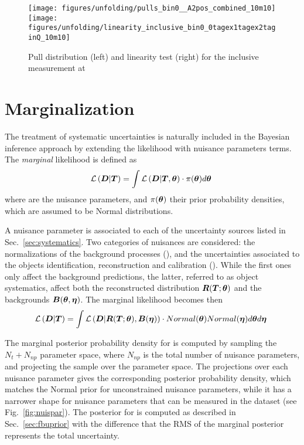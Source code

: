 \begin{figure}[!htb]\centering
  \texttt{[image: figures/unfolding/pulls\_bin0\_\_A2pos\_combined\_10m10]}
  \texttt{[image: figures/unfolding/linearity\_inclusive\_bin0\_0tagex1tagex2taginQ\_10m10]}
  \caption{Pull distribution (left) and linearity test (right) for the
    inclusive \ac{} measurement at \eighttev{}}
  \label{fig:pulllinearity}
\end{figure}

\section{Marginalization}
\label{sec:marginalization}

The treatment of systematic uncertainties is naturally included in the
Bayesian inference approach by extending the likelihood
\conditionalLhood{\Data{}}{\Truth{}} with nuisance parameters terms.
The {\it marginal} likelihood is defined as
\begin{equation}
  \mathcal{L}\left(\boldsymbol{D}{}|\boldsymbol{T}{}\right)=
  \int
  \mathcal{L}\left(\boldsymbol{D}{}|\boldsymbol{T}{},\boldsymbol{\theta}{}\right) 
  \cdot{} \pi{}(\boldsymbol{\theta}{})
  d\boldsymbol{\theta}{}\phantom{,}
\end{equation}
where \thetavec{} are the nuisance parameters, and
$\pi{}(\boldsymbol{\theta}{})$ their prior probability densities, which are
assumed to be Normal distributions.

A nuisance parameter is associated to each of the uncertainty sources
listed in Sec.~\ref{sec:systematics}. Two categories of nuisances
are considered: the normalizations of the background processes
(\etavec{}), and the uncertainties associated to the objects
identification, reconstruction and calibration (\thetavec{}).
While the first ones only affect the background predictions, the
latter, referred to as object systematics, affect both the
reconstructed distribution $\boldsymbol{R}{}(\boldsymbol{T}{};\boldsymbol{\theta}{})$ and the backgrounds
$\boldsymbol{B}{}(\boldsymbol{\theta}{},\boldsymbol{\eta}{})$. The marginal likelihood becomes then
\begin{equation}
\label{eq:marginalLhood}
  \mathcal{L}\left(\boldsymbol{D}{}|\boldsymbol{T}{}\right)=
  \int
  \mathcal{L}\left(\boldsymbol{D}{}|\boldsymbol{R}{}(\boldsymbol{T}{};\boldsymbol{\theta}{}),\boldsymbol{B}{}(\boldsymbol{\eta}{})\right) 
  \cdot{} Normal(\boldsymbol{\theta}{}) Normal(\boldsymbol{\eta}{})
  d\boldsymbol{\theta}{} d\boldsymbol{\eta}{}\phantom{.}
\end{equation}

The marginal posterior probability density for \Truth{} is computed by
sampling the $N_t+N_{np}$ parameter space, where $N_{np}$ is the
total number of nuisance parameters, and projecting the sample over
the \Truth{} parameter space. The projections over each nuisance
parameter gives the corresponding posterior probability density,
which matches the Normal prior for unconstrained nuisance
parameters, while it has a narrower shape for nuisance parameters
that can be measured in the dataset (see Fig.~\ref{fig:nuispar}). 
The posterior for \ac{} is computed as described in
Sec.~\ref{sec:fbuprior} with the difference that the RMS of the
marginal posterior represents the total uncertainty.

